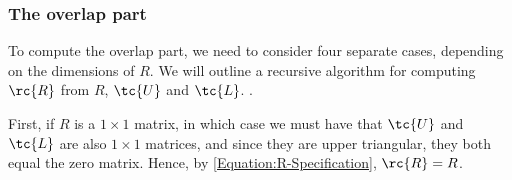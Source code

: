 \subsubsection{The overlap part}
\label{Section:Two-Step-Splitting}
To compute the overlap part, we need to consider four separate cases, depending on the dimensions of $R$. We will outline a recursive algorithm for computing $\rc{R}$ from $R$, $\tc{U}$ and $\tc{L}$. %
. 

First, if $R$ is a $1 \times 1$ matrix, in which case we must have that $\tc{U}$ and $\tc{L}$ are also $1 \times 1$ matrices, and since they are upper triangular, they both equal the zero matrix. Hence, by \eqref{Equation:R-Specification}, $\rc{R} = R$.%

